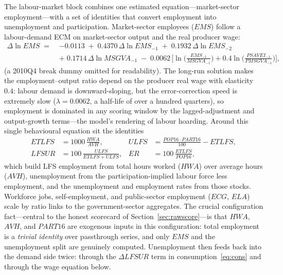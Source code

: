 The labour-market block combines one estimated equation---market-sector employment---with a set of identities that convert employment into unemployment and participation. Market-sector employees ($EMS$) follow a labour-demand ECM on market-sector output and the real producer wage:
\begin{equation}
\begin{aligned}
\Delta \ln EMS \;=\;& -0.0113 \;+\; 0.4370\,\Delta \ln EMS_{-1} \;+\; 0.1932\,\Delta \ln EMS_{-2} \\
&+\; 0.1714\,\Delta \ln MSGVA_{-1} \;-\; 0.0062\,\Big[ \ln\!\big(\tfrac{EMS_{-1}}{MSGVA_{-1}}\big) + 0.4 \ln\!\big(\tfrac{PSAVEI_{-1}}{PMSGVA_{-1}}\big) \Big],
\end{aligned}
\label{eq:ems}
\end{equation}
(a 2010Q4 break dummy omitted for readability). The long-run solution makes the employment--output ratio depend on the producer real wage with elasticity $0.4$: labour demand is downward-sloping, but the error-correction speed is extremely slow ($\lambda = 0.0062$, a half-life of over a hundred quarters), so employment is dominated in any scoring window by the lagged-adjustment and output-growth terms---the model's rendering of labour hoarding. Around this single behavioural equation sit the identities
\begin{align}
ETLFS &= 1000\,\frac{HWA}{AVH}, &
ULFS &= \frac{POP16 \cdot PART16}{100} - ETLFS, \label{eq:etlfs}\\
LFSUR &= 100\,\frac{ULFS}{ETLFS + ULFS}, &
ER &= 100\,\frac{ETLFS}{POP16},
\label{eq:lfsur}
\end{align}
which build LFS employment from total hours worked ($HWA$) over average hours ($AVH$), unemployment from the participation-implied labour force less employment, and the unemployment and employment rates from those stocks. Workforce jobs, self-employment, and public-sector employment ($ECG$, $ELA$) scale by ratio links to the government-sector aggregates. The crucial configuration fact---central to the honest scorecard of Section~\ref{sec:rawscore}---is that $HWA$, $AVH$, and $PART16$ are exogenous inputs in this configuration: total employment is a \emph{trivial identity} over passthrough series, and only $EMS$ and the unemployment split are genuinely computed. Unemployment then feeds back into the demand side twice: through the $\Delta LFSUR$ term in consumption~\eqref{eq:cons} and through the wage equation below.

